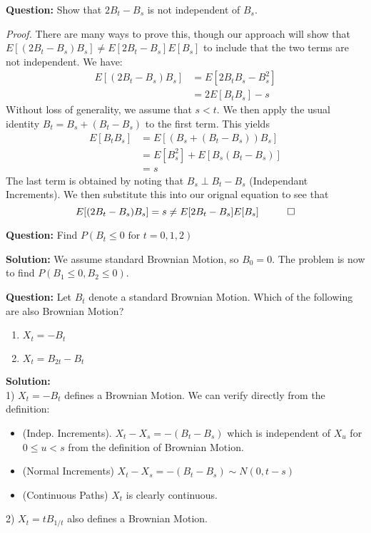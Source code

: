 \documentclass{article}
\begin{document}
\begin{tcolorbox}[colframe=black,colback=gray!5,boxrule=0.5pt]
\textbf{Question:} Show that $2B_{t} - B_s$ is not independent of $B_s$. \cite{Fima}
\end{tcolorbox}
\textit{Proof.} There are many ways to prove this, though our approach will show that $E[(2B_t-B_s)B_s]\neq E[2B_t-B_s] E[B_s]$ to include that the two terms are not independent. We have: 
\begin{align*}
    E[(2B_t-B_s)B_s] &= E[2B_tB_s - B_s^2] \\
    &= 2E[B_t B_s] - s
\end{align*}
Without loss of generality, we assume that $s<t$. We then apply the usual identity $B_t = B_s + (B_t - B_s)$ to the first term. This yields
\begin{align*}
    E[B_t B_s] &= E[(B_s + (B_t - B_s))B_s] \\
    &=E[B_s^2] + E[B_s(B_t - B_s)] \\
    &= s
\end{align*}
The last term is obtained by noting that $B_s \perp B_{t} - B_s$ (Independant Increments). We then substitute this into our orignal equation to see that 
$$E[(2B_t-B_s)B_s] = s \neq E[2B_t-B_s]E[B_s] \hspace{10mm} \Box$$

\vspace{2mm}

\begin{tcolorbox}[colframe=black,colback=gray!5,boxrule=0.5pt]
\textbf{Question:} Find $P(B_t\leq0\text{ for } t=0,1,2)$ \cite{Fima}
\end{tcolorbox}
\textbf{Solution:} We assume standard Brownian Motion, so $B_0=0$. The problem is now to find $P(B_1\leq0, B_2\leq0)$.


\vspace{2mm}

\begin{tcolorbox}[colframe=black,colback=gray!5,boxrule=0.5pt]
\textbf{Question:} Let $B_t$ denote a standard Brownian Motion. Which of the following are also Brownian Motion? \cite{Fima}
\begin{enumerate}
    \item $X_t = -B_t$
    \item $X_t = B_{2t} - B_t$
\end{enumerate} 
\end{tcolorbox}

\textbf{Solution:}\\
1) $X_t = -B_t$ defines a Brownian Motion. We can verify directly from the definition: 
\begin{itemize}
    \item (Indep. Increments). $X_t - X_s = -(B_t - B_s)$ which is independent of $X_u$ for $0\leq u <s$ from the definition of Brownian Motion. 
    \item (Normal Increments) $X_t - X_s = -(B_t - B_s) \sim N(0, t-s)$
    \item (Continuous Paths) $X_t$ is clearly continuous.
\end{itemize}
2) $X_t = t B_{1/t}$ also defines a Brownian Motion.
\end{document}
